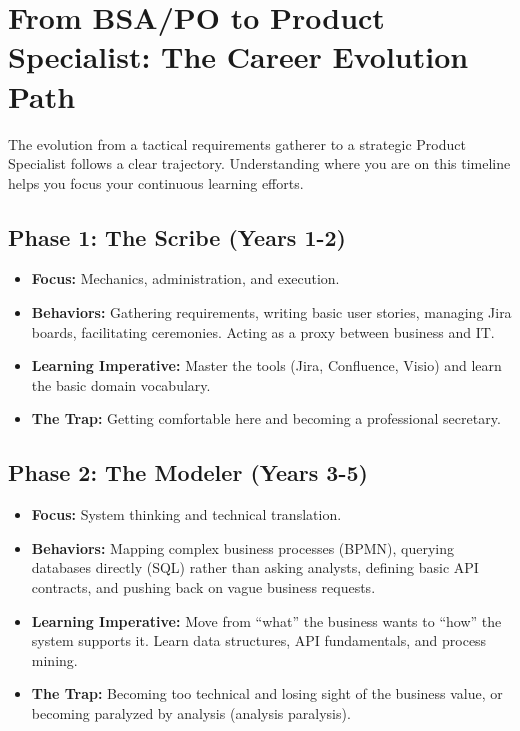 \documentclass[
  11pt,
  openany,
  oneside]{book}
\providecommand{\tightlist}{%
  \setlength{\itemsep}{0pt}\setlength{\parskip}{0pt}}
\begin{document}
\bigskip

\section{From BSA/PO to Product Specialist: The Career Evolution
Path}\label{from-bsapo-to-product-specialist-the-career-evolution-path}

The evolution from a tactical requirements gatherer to a strategic
Product Specialist follows a clear trajectory. Understanding where you
are on this timeline helps you focus your continuous learning efforts.

\subsection{Phase 1: The Scribe (Years
1-2)}\label{phase-1-the-scribe-years-1-2}

\begin{itemize}
\tightlist
\item
  \textbf{Focus:} Mechanics, administration, and execution.
\item
  \textbf{Behaviors:} Gathering requirements, writing basic user
  stories, managing Jira boards, facilitating ceremonies. Acting as a
  proxy between business and IT.
\item
  \textbf{Learning Imperative:} Master the tools (Jira, Confluence,
  Visio) and learn the basic domain vocabulary.
\item
  \textbf{The Trap:} Getting comfortable here and becoming a
  professional secretary.
\end{itemize}

\subsection{Phase 2: The Modeler (Years
3-5)}\label{phase-2-the-modeler-years-3-5}

\begin{itemize}
\tightlist
\item
  \textbf{Focus:} System thinking and technical translation.
\item
  \textbf{Behaviors:} Mapping complex business processes (BPMN),
  querying databases directly (SQL) rather than asking analysts,
  defining basic API contracts, and pushing back on vague business
  requests.
\item
  \textbf{Learning Imperative:} Move from ``what'' the business wants to
  ``how'' the system supports it. Learn data structures, API
  fundamentals, and process mining.
\item
  \textbf{The Trap:} Becoming too technical and losing sight of the
  business value, or becoming paralyzed by analysis (analysis
  paralysis).
\end{itemize}
\end{document}
